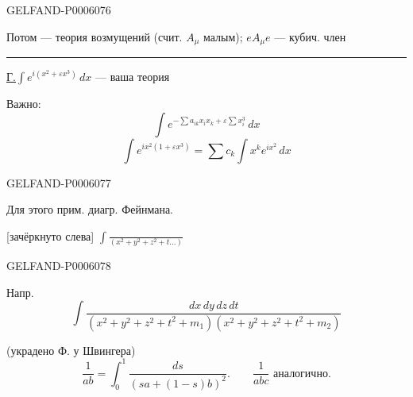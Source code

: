 \begin{GelfandAdjacentEvidence}{GELFAND-P000607}{6}


Потом — теория возмущений (счит. \(A_\mu\) малым); \(eA_\mu e\) — кубич. член

\rule{.22\linewidth}{.4pt}\par
\underline{Г.}\qquad \(\int e^{i(x^2+\varepsilon x^3)}\,dx\) — ваша теория

Важно:
\[
\int e^{-\sum a_{ik}x_ix_k+\varepsilon\sum x_i^3}\,dx
\]
\[
\int e^{ix^2(1+\varepsilon x^3)}=\sum c_k\int x^k e^{ix^2}\,dx
\]
\end{GelfandAdjacentEvidence}
\begin{GelfandAdjacentEvidence}{GELFAND-P000607}{7}


Для этого прим. диагр. Фейнмана.

[зачёркнуто слева] \(\int\frac{\phantom{dx}}{(x^2+y^2+z^2+t\ldots)}\)
\end{GelfandAdjacentEvidence}
\begin{GelfandAdjacentEvidence}{GELFAND-P000607}{8}


Напр.
\[
\int\frac{dx\,dy\,dz\,dt}
{(x^2+y^2+z^2+t^2+m_1)(x^2+y^2+z^2+t^2+m_2)}
\]
\end{GelfandAdjacentEvidence}

(украдено Ф. у Швингера)
\[
\frac1{ab}=\int_0^1\frac{ds}{(sa+(1-s)b)^2}.\qquad
\frac1{abc}\text{ аналогично.}
\]


